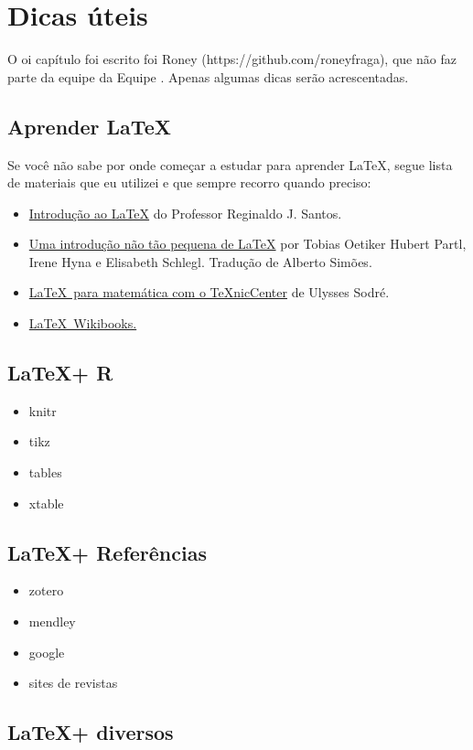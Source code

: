 \chapter{Dicas úteis}\label{cap_dicas}

O oi capítulo foi escrito foi Roney (https://github.com/roneyfraga), que não faz parte da equipe da Equipe \abnTeX . Apenas algumas dicas serão acrescentadas.

\section{Aprender \LaTeX }
Se você não sabe por onde começar a estudar para aprender \LaTeX, segue lista de materiais que eu utilizei e que sempre recorro quando preciso:

\begin{itemize}
    \item \href{http://www.mat.ufmg.br/~regi/topicos/intlat.pdf}{Introdução ao \LaTeX} do Professor Reginaldo J. Santos.
    \item \href{http://zelmanov.ptep-online.com/ctan/lshort_port.pdf}{Uma introdução não tão pequena de \LaTeX} por Tobias Oetiker Hubert Partl, Irene Hyna e Elisabeth Schlegl. Tradução de Alberto Simões.
    \item \href{http://www.uel.br/projetos/matessencial/superior/pdfs/latexmat.pdf}{\LaTeX\ para matemática com o TeXnicCenter} de Ulysses Sodré.
    \item \href{http://en.wikibooks.org/wiki/LaTeX}{\LaTeX\ Wikibooks.}
\end{itemize}

\section{\LaTeX + R}

\begin{itemize}
    \item knitr
    \item tikz
    \item tables
    \item xtable
\end{itemize}

\section{\LaTeX + Referências}

\begin{itemize}
    \item zotero
    \item mendley
    \item google
    \item sites de revistas
\end{itemize}

\section{\LaTeX + diversos}


